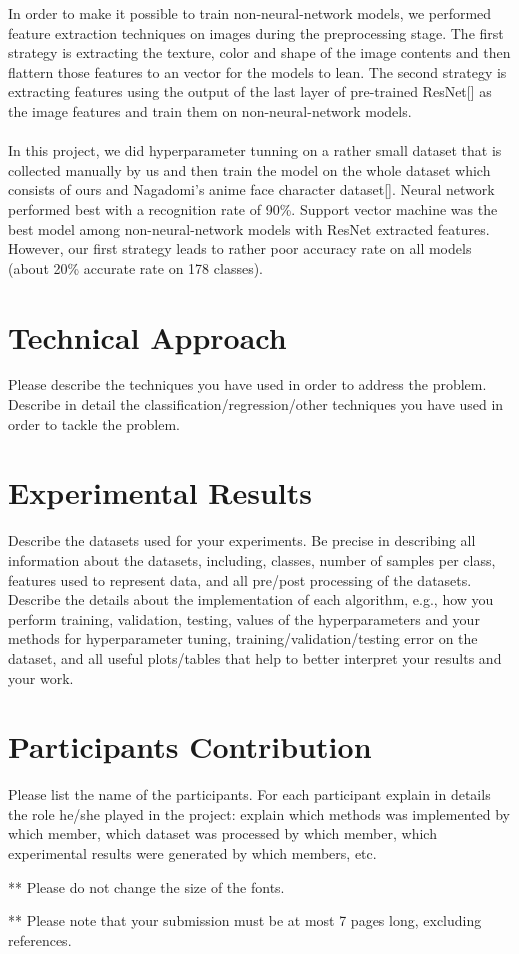 \documentclass[11.5pt]{article}
\begin{document}
In order to make it possible to train non-neural-network models, we performed feature extraction techniques on images during the preprocessing stage. The first strategy is extracting the texture, color and shape of the image contents and then flattern those features to an vector for the models to lean. The second strategy is extracting features using the output of the last layer of pre-trained ResNet[] as the image features and train them on non-neural-network models.\\ \\
In this project, we did hyperparameter tunning on a rather small dataset that is collected manually by us and then train the model on the whole dataset which consists of ours and Nagadomi’s anime face character dataset[]. Neural network performed best with a recognition rate of 90\%. Support vector machine was the best model among non-neural-network models with ResNet extracted features. However, our first strategy leads to rather poor accuracy rate on all models (about 20\% accurate rate on 178 classes). 


\section{Technical Approach}
Please describe the techniques you have used in order to address the problem. Describe in detail the classification/regression/other techniques you have used in order to tackle the problem.

\section{Experimental Results}
Describe the datasets used for your experiments. Be precise in describing all information about the datasets, including, classes, number of samples per class, features used to represent data, and all pre/post processing of the datasets.\\
Describe the details about the implementation of each algorithm, e.g., how you perform training, validation, testing, values of the hyperparameters and your methods for hyperparameter tuning, training/validation/testing error on the dataset, and all useful plots/tables that help to better interpret your results and your work.

\section{Participants Contribution}
Please list the name of the participants. For each participant explain in details the role he/she played in the project: explain which methods was implemented by which member, which dataset was processed by which member, which experimental results were generated by which members, etc.

\vspace{10mm}
** Please do not change the size of the fonts.

** Please note that your submission must be at most 7 pages long, excluding references.
\end{document}

